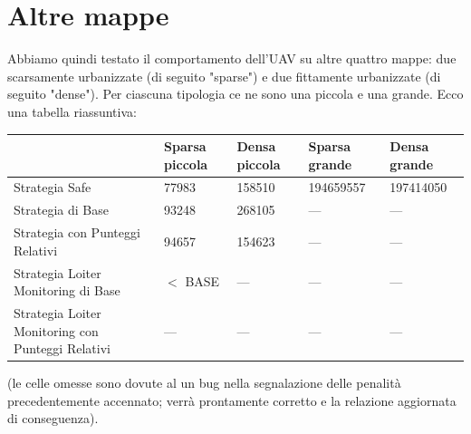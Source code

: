 \section{Altre mappe}

Abbiamo quindi testato il comportamento dell'UAV su altre quattro mappe: due scarsamente urbanizzate (di seguito "sparse") e due fittamente urbanizzate (di seguito "dense"). Per ciascuna tipologia ce ne sono una piccola e una grande. Ecco una tabella riassuntiva:
\begin{center}
{\tiny
    \begin{tabular}{| l | l | l | l | l |} \hline
                                                        & \textbf{Sparsa piccola}   & \textbf{Densa piccola}    & \textbf{Sparsa grande}    & \textbf{Densa grande} \\ \hline
    Strategia Safe                                      & 77983                     & 158510                    & 194659557                 & 197414050             \\ \hline
    Strategia di Base                                   & 93248                     & 268105                    & ---                       & ---                   \\ \hline
    Strategia con Punteggi Relativi                     & 94657                     & 154623                    & ---                       & ---                   \\ \hline
    Strategia Loiter Monitoring di Base                 & $<$ BASE                  & ---                       & ---                       & ---                   \\ \hline
    Strategia Loiter Monitoring con Punteggi Relativi   & ---                       & ---                       & ---                       & ---                   \\ \hline
    \end{tabular}
}
\end{center}

(le celle omesse sono dovute al un bug nella segnalazione delle penalità precedentemente accennato; verrà prontamente corretto e la relazione aggiornata di conseguenza).
